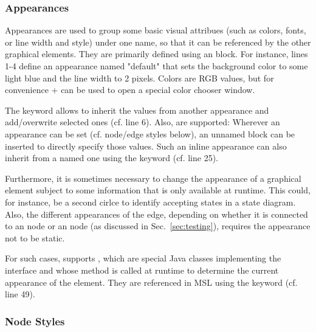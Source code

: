 \documentclass[a4paper,american,12pt]{scrreprt}
\begin{document}
\subsubsection{Appearances}

Appearances are used to group some basic visual attribues (such as colors,
fonts, or line width and style) under one name, so that it can be referenced by
the other graphical elements. They are primarily defined using an
  block. For instance, lines 1-4 define an
appearance named "default" that sets the background color to some light blue and
the line width to 2 pixels. Colors are RGB values, but for convenience
+ can be used to open a special color chooser
window.

The keyword  allows to inherit the values from another appearance
and add/overwrite selected ones (cf. line 6). Also,  are supported: Wherever an appearance can be set (cf.
node/edge styles below), an unnamed  block can be inserted to
directly specify those values. Such an inline appearance can also inherit from
a named one using the keyword  (cf. line 25).

Furthermore, it is sometimes necessary to change the appearance of a graphical
element subject to some information that is only available at runtime. This
could, for instance, be a second cirlce to identify accepting states in a state
diagram. Also, the different appearances of the  edge, depending
on whether it is connected to an  node or an  node (as
discussed in Sec.~\ref{sec:testing}), requires the appearance not to be static. 

For such cases, \cinco{} supports ,
which are special Java classes implementing the 
interface and whose  method is called at runtime to
determine the current appearance of the element. They are referenced in MSL using
the  keyword (cf. line 49).


\subsubsection{Node Styles}
\end{document}
